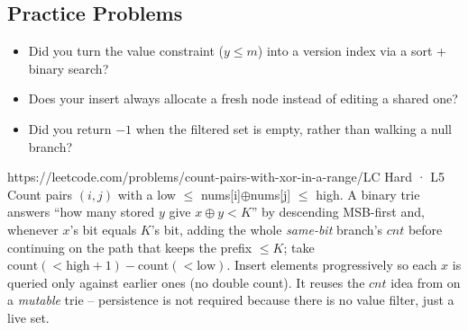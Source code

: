 \subsection{Practice Problems}

\begin{stuckbox}
\begin{itemize}[nosep, leftmargin=1.4em]
  \item Did you turn the value constraint ($y\le m$) into a version index via a sort + binary search?
  \item Does your insert always allocate a fresh node instead of editing a shared one?
  \item Did you return $-1$ when the filtered set is empty, rather than walking a null branch?
\end{itemize}
\end{stuckbox}

\begin{practiceset}
    {https://leetcode.com/problems/count-pairs-with-xor-in-a-range/}{LC Hard · L5}
    {Count pairs $(i,j)$ with a low $\le$ nums[i]$\oplus$nums[j] $\le$ high. A binary trie answers
    ``how many stored $y$ give $x\oplus y < K$'' by descending MSB-first and, whenever $x$'s bit equals
    $K$'s bit, adding the whole \emph{same-bit} branch's $\mathit{cnt}$ before continuing on the path that
    keeps the prefix $\le K$; take $\text{count}(<\text{high}{+}1)-\text{count}(<\text{low})$. Insert
    elements progressively so each $x$ is queried only against earlier ones (no double count). It reuses
    the $\mathit{cnt}$ idea from  on a \emph{mutable} trie -- persistence is not
    required because there is no value filter, just a live set.}
\end{practiceset}

